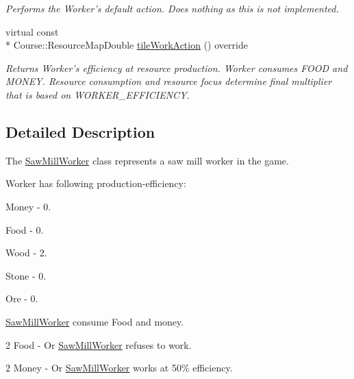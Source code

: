 \begin{DoxyCompactItemize}
\begin{DoxyCompactList}\small\item\em Performs the Worker's default action. Does nothing as this is not implemented. \end{DoxyCompactList}\item 
virtual const \\*
Course\-::\-Resource\-Map\-Double \hyperlink{classSawMillWorker_a4e94afc96b0b95c54d4ab66a76d1cc84}{tile\-Work\-Action} () override
\begin{DoxyCompactList}\small\item\em Returns Worker's efficiency at resource production. Worker consumes F\-O\-O\-D and M\-O\-N\-E\-Y. Resource consumption and resource focus determine final multiplier that is based on W\-O\-R\-K\-E\-R\-\_\-\-E\-F\-F\-I\-C\-I\-E\-N\-C\-Y. \end{DoxyCompactList}\end{DoxyCompactItemize}


\subsection{Detailed Description}
The \hyperlink{classSawMillWorker}{Saw\-Mill\-Worker} class represents a saw mill worker in the game. 

Worker has following production-\/efficiency\-: \par

\begin{DoxyItemize}
\item Money -\/ 0. \par

\item Food -\/ 0. \par

\item Wood -\/ 2. \par

\item Stone -\/ 0. \par

\item Ore -\/ 0. \par
 \hyperlink{classSawMillWorker}{Saw\-Mill\-Worker} consume Food and money. \par

\item 2 Food -\/ Or \hyperlink{classSawMillWorker}{Saw\-Mill\-Worker} refuses to work. \par

\item 2 Money -\/ Or \hyperlink{classSawMillWorker}{Saw\-Mill\-Worker} works at 50\% efficiency. 
\end{DoxyItemize}


